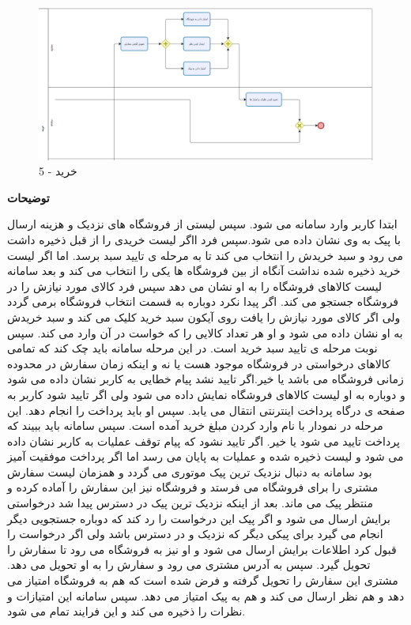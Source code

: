 \documentclass[12pt,a4paper]{article}
\begin{document}
		\begin{figure}[h!]
			\begin{center}
				\includegraphics[width=14cm]{images/Bizagi Buy 5.png}	
			\end{center}
			\caption{خرید - 5}
		\end{figure}
		
		\textbf{توضیحات}
		
		
		ابتدا کاربر وارد سامانه می شود. سپس لیستی از فروشگاه های نزدیک و هزینه ارسال با پیک به وی نشان داده می شود.سپس فرد ااگر لیست خریدی را از قبل ذخیره داشت می رود و سبد خریدش را انتخاب می کند تا به مرحله ی تایید سبد برسد. اما اگر لیست خرید ذخیره شده نداشت آنگاه از بین فروشگاه ها یکی را انتخاب می کند و بعد سامانه لیست کالاهای فروشگاه را به او نشان می دهد سپس فرد کالای مورد نیازش را در فروشگاه جستجو می کند. اگر پیدا نکرد دوباره به قسمت انتخاب فروشگاه برمی گردد ولی اگر کالای مورد نیازش را یافت روی آیکون سبد خرید کلیک می کند و سبد خریدش به او نشان داده می شود و او هر تعداد کالایی را که خواست در آن وارد می کند. سپس نوبت مرحله ی تایید سبد خرید است. در این مرحله سامانه باید چک کند که تمامی کالاهای درخواستی در فروشگاه موجود هست یا نه و اینکه زمان سفارش در محدوده زمانی فروشگاه می باشد یا خیر.اگر تایید نشد پیام خطایی به کاربر نشان داده می شود و دوباره به او لیست کالاهای فروشگاه نمایش داده می شود ولی اگر تایید شود کاربر به صفحه ی درگاه پرداخت اینترنتی انتقال می یابد. سپس او باید  پرداخت را انجام دهد. این مرحله در نمودار با نام وارد کردن مبلغ خرید آمده است. سپس سامانه باید ببیند که پرداخت تایید می شود یا خیر. اگر تایید نشود که پیام توقف عملیات به کاربر نشان داده می شود و لیست ذخیره شده و عملیات به پایان می رسد اما اگر پرداخت موفقیت آمیز بود سامانه به دنبال نزدیک ترین پیک موتوری می گردد و همزمان لیست سفارش مشتری را برای فروشگاه می فرستد و فروشگاه نیز این سفارش را آماده کرده و منتظر پیک می ماند. بعد از اینکه نزدیک ترین پیک در دسترس پیدا شد درخواستی برایش ارسال می شود و اگر پیک این درخواست را رد کند که دوباره جستجویی دیگر انجام می گیرد برای پیکی دیگر که نزدیک و در دسترس باشد ولی اگر درخواست را قبول کرد اطلاعات برایش ارسال می شود و او نیز به فروشگاه می رود تا سفارش را تحویل گیرد. سپس به آدرس مشتری می رود و سفارش را به او تحویل می دهد. مشتری این سفارش را تحویل گرفته و فرض شده است که هم به فروشگاه امتیاز می دهد و هم نظر ارسال می کند و هم به پیک امتیاز می دهد. سپس سامانه این امتیازات و نظرات را ذخیره می کند و این فرایند تمام می شود.
		\pagebreak
	
\end{document}
